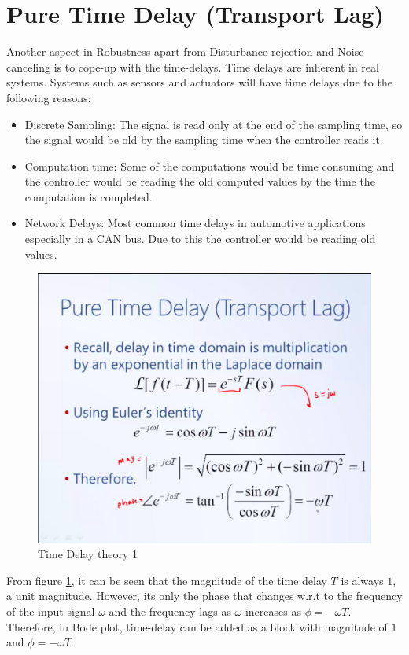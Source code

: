\section{Pure Time Delay (Transport Lag)}

Another aspect in Robustness apart from Disturbance rejection and Noise canceling is to cope-up with the time-delays. Time delays are inherent in real systems. Systems such as sensors and actuators will have time delays due to the following reasons:
\begin{itemize}
	\item Discrete Sampling: The signal is read only at the end of the sampling time, so the signal would be old by the sampling time when the controller reads it.
	\item Computation time: Some of the computations would be time consuming and the controller would be reading the old computed values by the time the computation is completed.
	\item Network Delays: Most common time delays in automotive applications especially in a CAN bus. Due to this the controller would be reading old values.
\end{itemize}

\begin{figure}[h!]
	\centering
	\includegraphics[width=0.8\linewidth]{Bilder/RC_TimeDelay_1}
	\caption{Time Delay theory 1}
	\label{Fig_RC_TD_1}
\end{figure}

From figure \ref{Fig_RC_TD_1}, it can be seen that the magnitude of the time delay $T$ is always $1$, a unit magnitude. However, its only the phase that changes w.r.t to the frequency of the input signal $\omega$ and the frequency lags as $\omega$ increases as $\phi = -\omega T$. Therefore, in Bode plot, time-delay can be added as a block with magnitude of $1$ and $\phi = -\omega T$.

